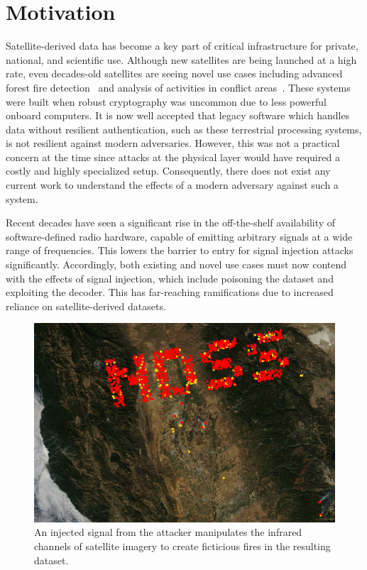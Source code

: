 \section{Motivation}

Satellite-derived data has become a key part of critical infrastructure for private, national, and scientific use.
Although new satellites are being launched at a high rate, even decades-old satellites are seeing novel use cases including advanced forest fire detection~\cite{nasaFirms} and analysis of activities in conflict areas~\cite{separatistLuminosity}. %
These systems were built when robust cryptography was uncommon due to less powerful onboard computers.
It is now well accepted that legacy software which handles data without resilient authentication, such as these terrestrial processing systems, is not resilient against modern adversaries.
However, this was not a practical concern at the time since attacks at the physical layer would have required a costly and highly specialized setup.
Consequently, there does not exist any current work to understand the effects of a modern adversary against such a system.

Recent decades have seen a significant rise in the off-the-shelf availability of software-defined radio hardware, capable of emitting arbitrary signals at a wide range of frequencies.
This lowers the barrier to entry for signal injection attacks significantly.
Accordingly, both existing and novel use cases must now contend with the effects of signal injection, which include poisoning the dataset and exploiting the decoder.
This has far-reaching ramifications due to increased reliance on satellite-derived datasets.

\begin{figure}
    \includegraphics[width=\columnwidth]{diagrams/injection/pixels_800_140.jpg}
    \caption{An injected signal from the attacker manipulates the infrared channels of satellite imagery to create ficticious fires in the resulting dataset.}
    \label{fig:location-injection}
\end{figure}

